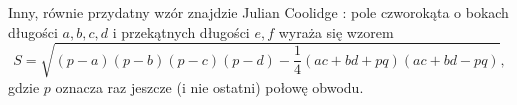 Inny, równie przydatny wzór znajdzie Julian Coolidge \cite{coolidge_1939}:
%
pole czworokąta o bokach długości $a, b, c, d$ i przekątnych długości $e, f$ wyraża się wzorem
\begin{equation}
    S = \sqrt{(p-a)(p-b)(p-c)(p-d) - \frac 1 4 (ac + bd + pq)(ac + bd - pq)},
\end{equation}
gdzie $p$ oznacza raz jeszcze (i nie ostatni) połowę obwodu.


%